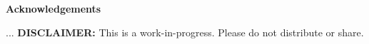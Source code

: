 
\newenvironment{acknowledgements}%
{\begin{center}%
\bfseries Acknowledgements
\end{center}}%
{\vfill\null}
\begin{acknowledgements}
...
\end{acknowledgements}
{\vfill\null}
\textbf{DISCLAIMER:}
This is a work-in-progress. Please do not distribute or share.
\pagebreak

